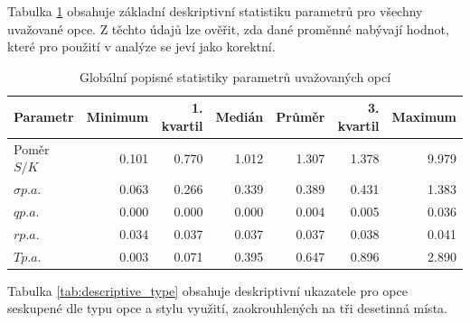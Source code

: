 \documentclass[male,czech,api_bc]{kitheses}
\begin{document}
  Tabulka \ref{tab:descriptive_total} obsahuje základní deskriptivní statistiku parametrů pro všechny uvažované opce. Z těchto údajů lze ověřit, zda dané proměnné nabývají hodnot, které pro použití v analýze se jeví jako korektní.

  \begin{table}[h!]
    \centering
    \caption{Globální popisné statistiky parametrů uvažovaných opcí}
    \label{tab:descriptive_total}
    \begin{tabular}{lrrrrrr}
      \toprule
      Parametr & Minimum & 1. kvartil & Medián & Průměr & 3. kvartil & Maximum \\
      \midrule
      Poměr $S/K$ & 0.101 & 0.770 & 1.012 & 1.307 & 1.378 & 9.979 \\
      $\sigma p.a.$ & 0.063 & 0.266 & 0.339 & 0.389 & 0.431 & 1.383 \\
      $q p.a.$ & 0.000 & 0.000 & 0.000 & 0.004 & 0.005 & 0.036 \\
      $r p.a.$ & 0.034 & 0.037 & 0.037 & 0.037 & 0.038 & 0.041 \\
      $T p.a.$ & 0.003 & 0.071 & 0.395 & 0.647 & 0.896 & 2.890 \\
      \bottomrule
    \end{tabular}
  \end{table}

  Tabulka \ref{tab:descriptive_type} obsahuje deskriptivní ukazatele pro opce seskupené dle typu opce a stylu využití, zaokrouhlených na tři desetinná místa. 
\end{document}
